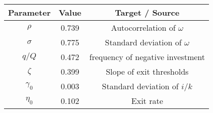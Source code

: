 {\fontshape\scdefault\selectfont 
\begin{tabular}{ccc}  
\hline\hline  
 Parameter & Value & Target / Source  \\  
 			\hline  
$\rho$ &0.739& Autocorrelation of $\omega$ \\  
 $\sigma$ &0.775& Standard deviation of $\omega$ \\  
 $q/Q$ &0.472& frequency of negative investment \\  
 $\zeta$ &0.399& Slope of exit thresholds \\  
 $\gamma_0$ &0.003& Standard deviation of $i/k$ \\  
 $\eta_0$ &0.102& Exit rate \\  
 \hline\hline  
 \end{tabular}  
 }  

